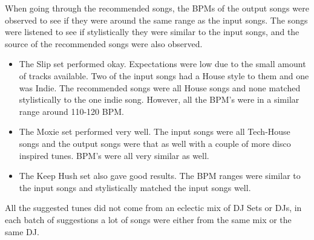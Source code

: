 When going through the recommended songs, the BPMs of the output songs were observed to see if they were around the same range as the input songs. The songs were listened to see if stylistically they were similar to the input songs, and the source of the recommended songs were also observed.

\begin{itemize}
	\item The Slip set performed okay. Expectations were low due to the small amount of tracks available. Two of the input songs had a House style to them and one was Indie. The recommended songs were all House songs and none matched stylistically to the one indie song. However, all the BPM's were in a similar range around 110-120 BPM.
	\item The Moxie set performed very well. The input songs were all Tech-House songs and the output songs were that as well with a couple of more disco inspired tunes. BPM's were all very similar as well.  
	\item The Keep Hush set also gave good results. The BPM ranges were similar to the input songs and stylistically matched the input songs well. 
\end{itemize}

All the suggested tunes did not come from an eclectic mix of DJ Sets or DJs, in each batch of suggestions a lot of songs were either from the same mix or the same DJ. 


